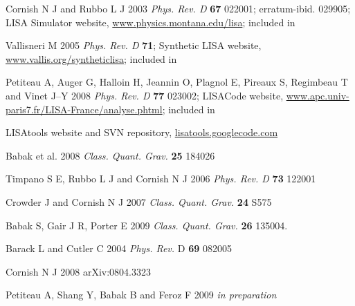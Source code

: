 \documentclass{iopart}
\begin{document}
\begin{thebibliography}{99}

 Cornish N J and Rubbo L J 2003 \textit{Phys. Rev. D} \textbf{67} 022001; erratum-ibid. 029905; LISA Simulator website, \url{www.physics.montana.edu/lisa}; included in \cite{lisatools}

 Vallisneri M 2005 \textit{Phys. Rev. D} \textbf{71}; Synthetic LISA website, \url{www.vallis.org/syntheticlisa}; included in \cite{lisatools}

 Petiteau A, Auger G, Halloin H, Jeannin O, Plagnol E, Pireaux S, Regimbeau T and Vinet J--Y 2008 \textit{Phys. Rev. D} \textbf{77} 023002; LISACode website, \url{www.apc.univ-paris7.fr/LISA-France/analyse.phtml}; included in \cite{lisatools}

 LISAtools website and SVN repository, \url{lisatools.googlecode.com}

Babak et al. 2008 \textit{Class. Quant. Grav.} \textbf{25} 184026

  Timpano S E, Rubbo L J and Cornish N J 2006 \textit{Phys. Rev. D} \textbf{73} 122001

  Crowder J and Cornish N J 2007 \textit{Class. Quant. Grav.}  \textbf{24} S575

 Babak S, Gair J R, Porter E 2009 \textit{Class. Quant. Grav.} \textbf{26} 135004.

 Barack L and Cutler C 2004 \textit{Phys. Rev.} D \textbf{69} 082005

 Cornish N J 2008 arXiv:0804.3323

Petiteau A, Shang Y, Babak B and Feroz F 2009 \textit{in preparation}


\end{thebibliography}
\end{document}
